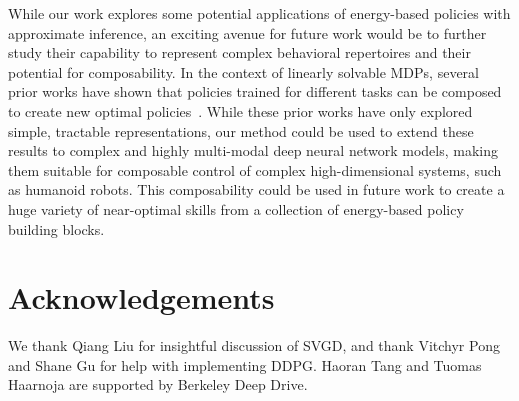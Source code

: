\documentclass{article}
\begin{document}
%
%

While our work explores some potential applications of energy-based policies with approximate inference, an exciting avenue for future work would be to further study their capability to represent complex behavioral repertoires and their potential for composability. In the context of linearly solvable MDPs, several prior works have shown that policies trained for different tasks can be composed to create new optimal policies~\cite{da2009linear,todorov2009compositionality}. While these prior works have only explored simple, tractable representations, our method could be used to extend these results to complex and highly multi-modal deep neural network models, making them suitable for composable control of complex high-dimensional systems, such as humanoid robots. This composability could be used in future work to create a huge variety of near-optimal skills from a collection of energy-based policy building blocks.


\section{Acknowledgements}
%
We thank Qiang Liu for insightful discussion of SVGD, and thank Vitchyr Pong and Shane Gu for help with implementing DDPG. Haoran Tang and Tuomas Haarnoja are supported by Berkeley Deep Drive. 






\end{document}
